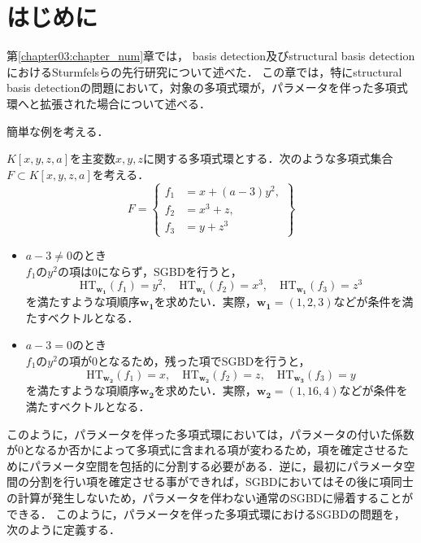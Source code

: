 \section{はじめに}
第\ref{chapter03:chapter_num}章では，\groebner{} basis detection及びstructural \groebner{} basis detectionにおけるSturmfelsらの先行研究について述べた．
この章では，特にstructural \groebner{} basis detectionの問題において，対象の多項式環が，パラメータを伴った多項式環へと拡張された場合について述べる．
\par
簡単な例を考える．
\begin{example}
	\label{chapter04:example:PD_example}
	$K[x, y, z, a]$を主変数$x, y, z$に関する多項式環とする．次のような多項式集合$F\subset K[x, y, z, a]$を考える．
	\begin{equation*}
		F = \left\{
			\begin{aligned}
				f_1 &= x + (a-3)y^2, \\
				f_2 &= x^3 + z, \\
				f_3 &= y + z^3
			\end{aligned}
		\right\}
	\end{equation*}
	\begin{itemize}
		\item $a - 3 \ne 0$のとき\\
			$f_1$の$y^2$の項は$0$にならず，SGBDを行うと，$$\mathrm{HT}_{\bm{w_1}}(f_1) = y^2, \quad \mathrm{HT}_{\bm{w_1}}(f_2) = x^3,\quad \mathrm{HT}_{\bm{w_1}}(f_3) = z^3$$を満たすような項順序$\bm{w_1}$を求めたい．実際，$\bm{w_1}=(1, 2, 3)$などが条件を満たすベクトルとなる．
		\item $a - 3 = 0$のとき\\
			$f_1$の$y^2$の項が$0$となるため，残った項でSGBDを行うと，$$\mathrm{HT}_{\bm{w_2}}(f_1) = x,\quad \mathrm{HT}_{\bm{w_2}}(f_2) = z,\quad \mathrm{HT}_{\bm{w_3}}(f_3) = y$$を満たすような項順序$\bm{w_2}$を求めたい．実際，$\bm{w_2} = (1, 16, 4)$などが条件を満たすベクトルとなる．
	\end{itemize}
\end{example}
このように，パラメータを伴った多項式環においては，パラメータの付いた係数が$0$となるか否かによって多項式に含まれる項が変わるため，項を確定させるためにパラメータ空間を包括的に分割する必要がある．逆に，最初にパラメータ空間の分割を行い項を確定させる事ができれば，SGBDにおいてはその後に項同士の計算が発生しないため，パラメータを伴わない通常のSGBDに帰着することができる．
このように，パラメータを伴った多項式環におけるSGBDの問題を，次のように定義する．
\newpage
